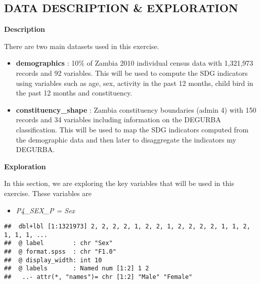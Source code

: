 \documentclass[
]{article}
\newenvironment{Shaded}{\begin{snugshade}}{\end{snugshade}}
\newcommand{\CommentTok}[1]{\textcolor[rgb]{0.56,0.35,0.01}{\textit{#1}}}
\newcommand{\FunctionTok}[1]{\textcolor[rgb]{0.13,0.29,0.53}{\textbf{#1}}}
\newcommand{\NormalTok}[1]{#1}
\newcommand{\SpecialCharTok}[1]{\textcolor[rgb]{0.81,0.36,0.00}{\textbf{#1}}}
\providecommand{\tightlist}{%
  \setlength{\itemsep}{0pt}\setlength{\parskip}{0pt}}
\begin{document}
\subsection{DATA DESCRIPTION \&
EXPLORATION}\label{data-description-exploration}

\textbf{Description}

There are two main datasets used in this exercise.

\begin{itemize}
\item
  \textbf{demographics} : 10\% of Zambia 2010 individual census data
  with 1,321,973 records and 92 variables. This will be used to compute
  the SDG indicators using variables such as age, sex, activity in the
  past 12 months, child bird in the past 12 months and constituency.
\item
  \textbf{constituency\_shape} : Zambia constituency boundaries (admin
  4) with 150 records and 34 variables including information on the
  DEGURBA classification. This will be used to map the SDG indicators
  computed from the demographic data and then later to disaggregate the
  indicators my DEGURBA.
\end{itemize}

\textbf{Exploration}

In this section, we are exploring the key variables that will be used in
this exercise. These variables are

\begin{itemize}
\tightlist
\item
  \emph{P4\_SEX\_P = Sex}
\end{itemize}

\begin{Shaded}
\end{Shaded}

\begin{verbatim}
##  dbl+lbl [1:1321973] 2, 2, 2, 2, 1, 2, 2, 1, 2, 2, 2, 2, 1, 1, 2, 1, 1, 1, ...
##  @ label        : chr "Sex"
##  @ format.spss  : chr "F1.0"
##  @ display_width: int 10
##  @ labels       : Named num [1:2] 1 2
##   ..- attr(*, "names")= chr [1:2] "Male" "Female"
\end{verbatim}
\end{document}
